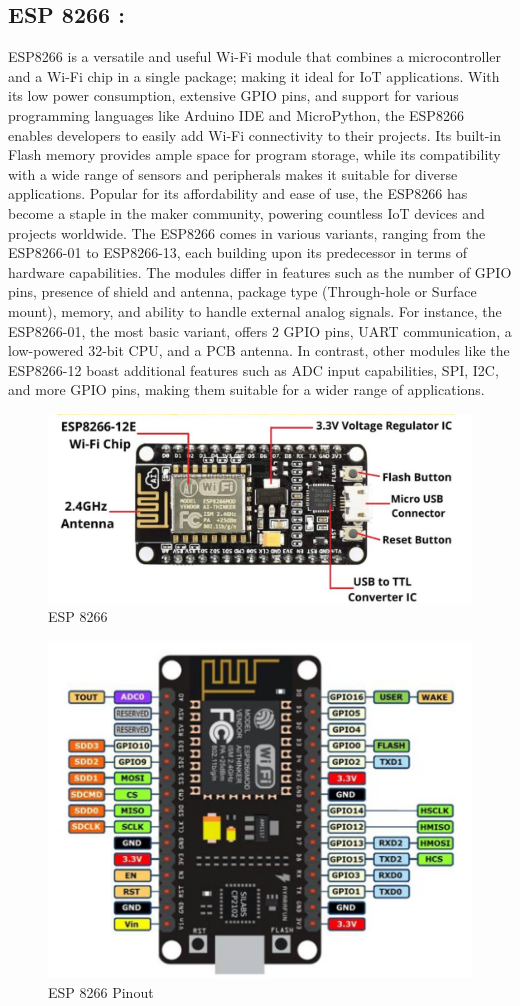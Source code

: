 \subsection{ESP 8266 :}
ESP8266 is a versatile and useful Wi-Fi module that combines a microcontroller and a Wi-Fi chip in a single package; making it ideal for IoT applications. With its low power consumption, extensive GPIO pins, and support for various programming languages like Arduino IDE and MicroPython, the ESP8266 enables developers to easily add Wi-Fi connectivity to their projects. Its built-in Flash memory provides ample space for program storage, while its compatibility with a wide range of sensors and peripherals makes it suitable for diverse applications. Popular for its affordability and ease of use, the ESP8266 has become a staple in the maker community, powering countless IoT devices and projects worldwide.
The ESP8266 comes in various variants, ranging from the ESP8266-01 to ESP8266-13, each building upon its predecessor in terms of hardware capabilities. The modules differ in features such as the number of GPIO pins, presence of shield and antenna, package type (Through-hole or Surface mount), memory, and ability to handle external analog signals. For instance, the ESP8266-01, the most basic variant, offers 2 GPIO pins, UART communication, a low-powered 32-bit CPU, and a PCB antenna. In contrast, other modules like the ESP8266-12 boast additional features such as ADC input capabilities, SPI, I2C, and more GPIO pins, making them suitable for a wider range of applications.

\begin{figure}[htbp]
     \centering
     \includegraphics[width=0.8\linewidth]{C_chap/fig2.png}
     \caption{ ESP 8266}
 \end{figure}
\begin{figure}[htbp]
     \centering
     \includegraphics[width=0.8\linewidth]{C_chap/fig3.png}
     \caption{ ESP 8266 Pinout}
 \end{figure}

